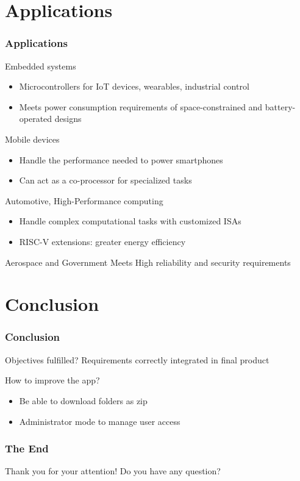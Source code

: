 \documentclass{beamer}
\begin{document}
		\section{Applications}
	\begin{frame}
		\frametitle{Applications}
		
		\begin{alertblock}{Embedded systems}
			\begin{itemize}
				\item Microcontrollers for IoT devices, wearables, industrial control
				\item Meets power consumption requirements of space-constrained and battery-operated designs
			\end{itemize}
		\end{alertblock}
		
		\begin{alertblock}{Mobile devices}
			\begin{itemize}
				\item Handle the performance needed to power smartphones
				\item Can act as a co-processor for specialized tasks
			\end{itemize}
		\end{alertblock}
		
		\begin{alertblock}{Automotive, High-Performance computing}
			\begin{itemize}
				\item Handle complex computational tasks with customized ISAs
				\item RISC-V extensions: greater energy efficiency
			\end{itemize}
		\end{alertblock}
		
		\begin{alertblock}{Aerospace and Government}
				Meets High reliability and security requirements
		\end{alertblock}
	\end{frame}
	
	\section{Conclusion}
	\begin{frame}
		\frametitle{Conclusion}
		
		\begin{alertblock}{Objectives fulfilled?}
			Requirements correctly integrated in final product
		\end{alertblock}
		
		\begin{alertblock}{How to improve the app?}
			\begin{itemize}
				\item Be able to download folders as zip
				\item Administrator mode to manage user access
			\end{itemize}
		\end{alertblock}
	\end{frame}
	
	\begin{frame}
		\frametitle{The End}
		
		\centering
		Thank you for your attention!
		\linebreak
		Do you have any question?
	\end{frame}
\end{document}
